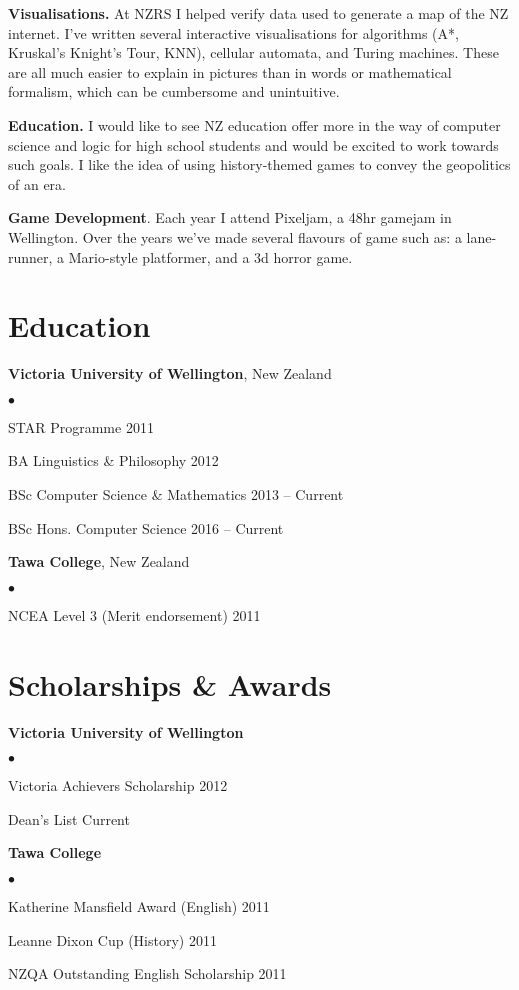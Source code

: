 \documentclass[margin,line]{res}
\newenvironment{list2}{
  \begin{list}{$\bullet$}{%
      \setlength{\itemsep}{0in}
      \setlength{\parsep}{0in} \setlength{\parskip}{0in}
      \setlength{\topsep}{0in} \setlength{\partopsep}{0in}
      \setlength{\leftmargin}{0.2in}}}
  {\end{list}}
\begin{document}
\begin{resume}
{\bf Visualisations.} At NZRS I helped verify data used to generate a map of the NZ internet. I've written several interactive visualisations for algorithms (A*, Kruskal's Knight's Tour, KNN), cellular automata, and Turing machines. These are all much easier to explain in pictures than in words or mathematical formalism, which can be cumbersome and unintuitive.

{\bf Education.} I would like to see NZ education offer more in the way of computer science and logic for high school students and would be excited to work towards such goals. I like the idea of using history-themed games to convey the geopolitics of an era.

{\bf Game Development}. Each year I attend Pixeljam, a 48hr gamejam in Wellington. Over the years we've made several flavours of game such as: a lane-runner, a Mario-style platformer, and a 3d horror game.

\section{\sc Education}
{\bf Victoria University of Wellington}, New Zealand
\begin{list2}
	\item STAR Programme \hfill 2011
	\item BA Linguistics \& Philosophy \hfill 2012
	\item BSc Computer Science \& Mathematics \hfill 2013 -- Current
	\item BSc Hons. Computer Science \hfill 2016 -- Current
\end{list2}

{\bf Tawa College}, New Zealand
\begin{list2}
	\item NCEA Level 3 (Merit endorsement) \hfill 2011
\end{list2}

\section{\sc Scholarships \& Awards}

{\bf Victoria University of Wellington}
\begin{list2}
	\item Victoria Achievers Scholarship \hfill 2012
	\item Dean's List \hfill Current
\end{list2}

{\bf Tawa College}
\begin{list2}
	\item Katherine Mansfield Award (English) \hfill 2011
	\item Leanne Dixon Cup (History) \hfill 2011
	\item NZQA Outstanding English Scholarship \hfill 2011
\end{list2}


\end{resume}
\end{document}

